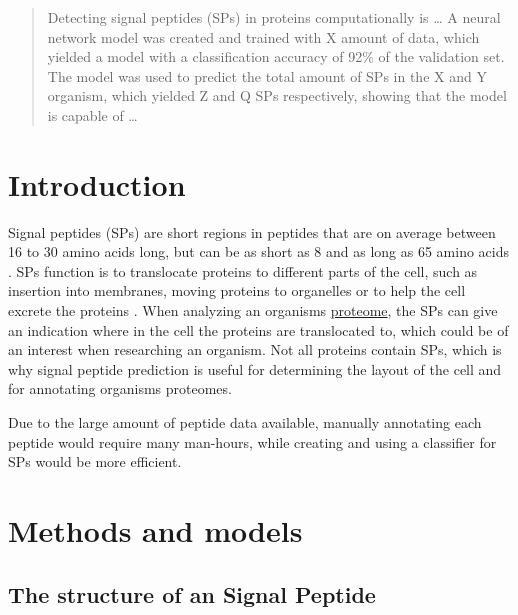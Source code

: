 \begin{abstract}
Detecting signal peptides (SPs) in proteins computationally is \dots
A neural network model was created and trained with X amount of data, which yielded a model with a classification accuracy of 92\% of the validation set.
The model was used to predict the total amount of SPs in the X and Y organism, which yielded Z and Q SPs respectively, showing that the model is capable of \dots

\end{abstract}


\section{Introduction}


Signal peptides (SPs) are short regions in peptides that are on average between 16 to 30 amino acids long, but can be as short as 8 and as long as 65 amino acids \cite{sp_length}. SPs function is to translocate proteins to different parts of the cell, such as insertion into membranes, moving proteins to organelles or to help the cell excrete the proteins \cite{sp_wiki}. When analyzing an organisms  \href{https://en.wikipedia.org/wiki/Proteome}{proteome}, the SPs can give an indication where in the cell the proteins are translocated to, which could be of an interest when researching an organism. Not all proteins contain SPs, which is why signal peptide prediction is useful for determining the layout of the cell and for annotating organisms proteomes. 

Due to the large amount of peptide data available, manually annotating each peptide would require many man-hours, while creating and using a classifier for SPs would be more efficient.



\section{Methods and models}

\subsection{The structure of an Signal Peptide}

